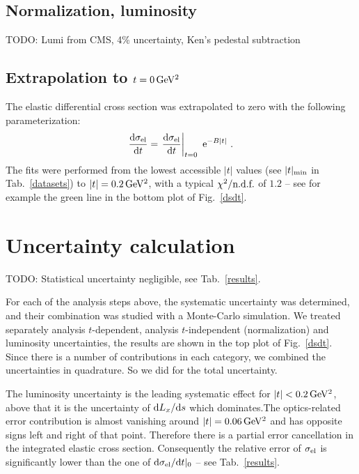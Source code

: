 \documentclass[doublecol]{../macros/epl2}
\def\d{{\rm d}}
\def\un#1{\,{\rm #1}}
\def\e{{\rm e}}
\begin{document}
\subsection{Normalization, luminosity}

TODO: Lumi from CMS, 4\% uncertainty, Ken's pedestal subtraction

\subsection{Extrapolation to $t=0\,\rm GeV^2$}

The elastic differential cross section was extrapolated to zero with the following parameterization:
\begin{equation}
\label{extrapolation}
{\d\sigma_{\rm el}\over \d t} = \left. {\d\sigma_{\rm el}\over \d t}\right|_{t=0} \ \e^{-B|t|}\ .
\end{equation}
The fits were performed from the lowest accessible $|t|$ values (see $|t|_{\rm min}$ in Tab.~\ref{datasets}) to $|t| = 0.2\un{GeV^2}$, with a typical $\chi^2/\hbox{n.d.f.}$ of $1.2$ -- see for example the green line in the bottom plot of Fig.~\ref{dsdt}.

\section{Uncertainty calculation}

TODO: Statistical uncertainty negligible, see Tab.~\ref{results}.

For each of the analysis steps above, the systematic uncertainty was determined, and their combination was studied with a Monte-Carlo simulation. We treated separately analysis $t$-dependent, analysis $t$-independent (normalization) and luminosity uncertainties, the results are shown in the top plot of Fig.~\ref{dsdt}. Since there is a number of contributions in each category, we combined the uncertainties in quadrature. So we did for the total uncertainty.

The luminosity uncertainty is the leading systematic effect for $|t| < 0.2\un{GeV^2}$, above that it is the uncertainty of $\d L_x/\d s$ which dominates.The optics-related error contribution is almost vanishing around $|t| = 0.06\un{GeV^2}$ and has opposite signs left and right of that point. Therefore there is a partial error cancellation in the integrated elastic cross section. Consequently the relative error of $\sigma_{\rm el}$ is significantly lower than the one of $\d\sigma_{\rm el}/\d t|_0$ -- see Tab.~\ref{results}.
\end{document}
